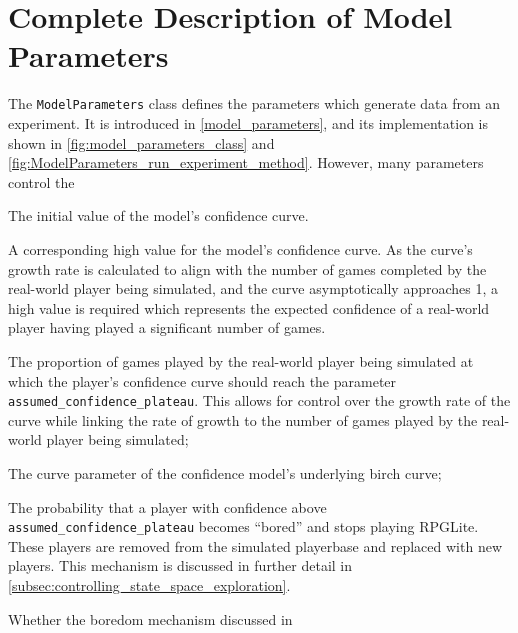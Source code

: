 \chapter{Complete Description of Model Parameters}
\label{appendix_model_parameters}

The \lstinline{ModelParameters} class defines the parameters which generate data
from an experiment. It is introduced in \cref{model_parameters}, and its
implementation is shown in \cref{fig:model_parameters_class} and
\cref{fig:ModelParameters_run_experiment_method}. However, many parameters
control the 

  

\begin{description}[style=multiline,leftmargin=3cm]
  \item[starting\\confidence] The initial value of the model's confidence curve.
  \item[assumed\\confidence\\plateau] A corresponding high value for the model's
  confidence curve. As the curve's growth rate is calculated to align with the
  number of games completed by the real-world player being simulated, and the
  curve asymptotically approaches 1, a high value is required which represents
  the expected confidence of a real-world player having played a significant
  number of games.
  \item[curve\\inflection\\relative to\\numgames] The proportion of games played by
  the real-world player being simulated at which the player's confidence
  curve should reach the parameter \lstinline{assumed_confidence_plateau}. This
  allows for control over the growth rate of the curve while linking the rate of
  growth to the number of games played by the real-world player being simulated;
  \item[C] The curve parameter of the confidence model's underlying birch curve;
  \item[prob\\bored] The probability that a player with confidence above
  \lstinline{assumed_confidence_plateau} becomes ``bored'' and stops playing
  RPGLite. These players are removed from the simulated playerbase and replaced
  with new players. This mechanism is discussed in further detail in
  \cref{subsec:controlling_state_space_exploration}.
  \item[boredom\\enabled] Whether the boredom mechanism discussed in

\end{description}
